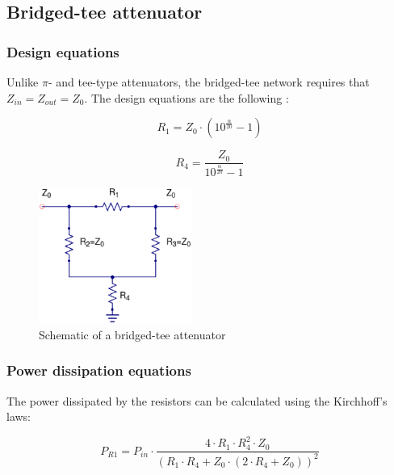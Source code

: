 \clearpage
\subsection{Bridged-tee attenuator}
\subsubsection{Design equations}

\noindent Unlike $\pi$- and tee-type attenuators, the bridged-tee network requires that $Z_{in} = Z_{out} = Z_{0}$. The design equations are the following \cite{Vizmuller}:

\begin{equation}
R_{1} = Z_{0} \cdot \left( 10^{\frac{\alpha}{20}} -1 \right)
\end{equation}

\begin{equation}
R_{4} = \dfrac{Z_{0}}{  10^{\frac{\alpha}{20}} -1 }
\end{equation}

\begin{figure}[ht]
\begin{center}
\includegraphics[width=5cm]{bitmaps/synthesis/attenuators/Bridged-Tee-Schematic}
\end{center}
\caption{Schematic of a bridged-tee attenuator}
\label{fig:bridged_pow_diss_Zin_50_Zout_75}
\end{figure}
\FloatBarrier

\subsubsection{Power dissipation equations}

\noindent The power dissipated by the resistors can be calculated using the Kirchhoff's laws:

\begin{equation}
P_{R1} = P_{in} \cdot \dfrac{4\cdot R_1\cdot R_4^2 \cdot Z_0}{ (R_1 \cdot R_4 + Z_0 \cdot (2 \cdot R_4 + Z_0))^2}
\end{equation}

